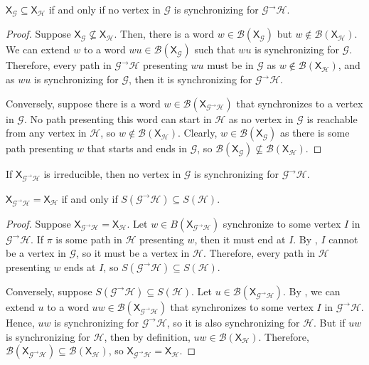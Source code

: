 \documentclass[hidelinks]{report}
\newcommand{\Gc}{\mathcal{G}}  %
\newcommand{\Hc}{\mathcal{H}}  %
\newcommand{\Bc}{\mathcal{B}}
\newcommand{\GtH}{{\Gc^\to\Hc}}
\newcommand{\shift}[1]{\mathsf{X}_{#1}}
\theoremstyle{definition}
\begin{document}
\begin{theorem}\label{subshiftsyncequiv}
    \(\shift{\Gc} \subseteq \shift{\Hc}\) if and only if no vertex in \(\Gc\) is synchronizing for 
    \(\GtH\).
\end{theorem}

\begin{proof}
    Suppose \(\shift{\Gc} \nsubseteq \shift{\Hc}\). Then, there is a word \(w \in \Bc(\shift{\Gc})\) 
    but \(w \notin \Bc(\shift{\Hc})\). We can extend \(w\) to a word \(wu \in \Bc(\shift{\Gc})\) such 
    that \(wu\) is synchronizing for \(\Gc\). Therefore, every path in \(\GtH\) presenting \(wu\) 
    must be in \(\Gc\) as \(w \notin \Bc(\shift{\Hc})\), and as \(wu\) is synchronizing 
    for \(\Gc\), then it is synchronizing for \(\GtH\).

    Conversely, suppose there is a word \(w \in \Bc(\shift{\GtH})\) that synchronizes to a vertex in \(\Gc\).
    No path presenting this word can start in \(\Hc\) as no vertex in \(\Gc\) is reachable from any 
    vertex in \(\Hc\), so \(w \notin \Bc(\shift{\Hc})\). Clearly, \(w \in \Bc(\shift{\Gc})\) 
    as there is some path presenting \(w\) that starts and ends in \(\Gc\), so 
    \(\Bc(\shift{\Gc}) \nsubseteq \Bc(\shift{\Hc})\).
\end{proof}

\begin{corollary}\label{nogsync}
    If \(\shift{\GtH}\) is irreducible, then no vertex in \(\Gc\) is synchronizing for \(\GtH\).
\end{corollary}

\begin{theorem}
    \(\shift{\GtH} = \shift{\Hc}\) if and only if \(S(\GtH) \subseteq S(\Hc)\).
\end{theorem}

\begin{proof}
    Suppose \(\shift{\GtH} = \shift{\Hc}\). Let \(w \in B(\shift{\GtH})\) synchronize to some vertex \(I\)
    in \(\GtH\).
    If \(\pi\) is some path in \(\Hc\) presenting \(w\), then it must end at \(I\). By 
    , \(I\) cannot be a vertex in \(\Gc\), so it must be a vertex in \(\Hc\).
    Therefore, every path in \(\Hc\) presenting \(w\) ends at \(I\), so \(S(\GtH) \subseteq S(\Hc)\).

    Conversely, suppose \(S(\GtH) \subseteq S(\Hc)\). Let \(u \in \Bc(\shift{\GtH})\).
    By , we can extend \(u\) to a word \(uw \in \Bc(\shift{\GtH})\) that 
    synchronizes to some vertex \(I\) in \(\GtH\). Hence, \(uw\) is synchronizing 
    for \(\GtH\), so it is also synchronizing for \(\Hc\). But if \(uw\) is synchronizing for
    \(\Hc\), then by definition, \(uw \in \Bc(\shift{\Hc})\). Therefore, \(\Bc(\shift{\GtH}) \subseteq \Bc(\shift{\Hc})\),
    so \(\shift{\GtH} = \shift{\Hc}\).
\end{proof}
\end{document}
